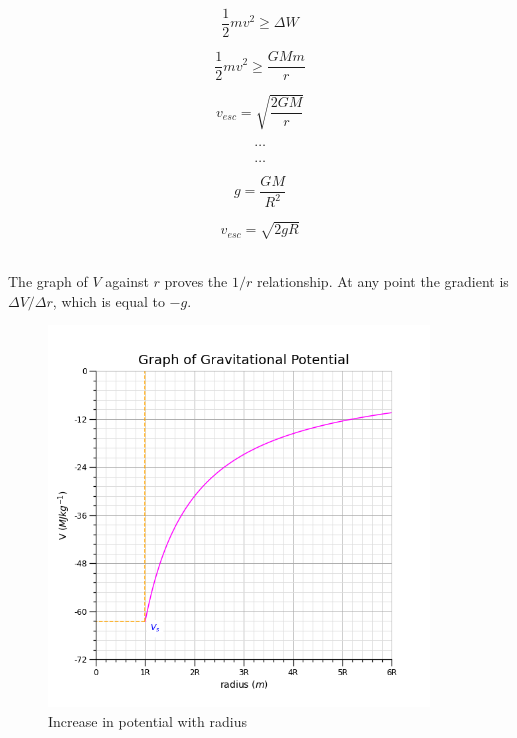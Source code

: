 \documentclass[10pt]{article}
\begin{document}
\begin{figure}[H]
\centering
\begin{minipage}{.8\textwidth}
\begin{tcolorbox}[
sharp corners=all,
colback=white,
colframe=white,
size=tight,
boxrule=0.2mm,
left=10mm, right=10mm
]
\begin{multicols}{2}
\noindent

\[\dfrac{1}{2} m v^2 \ge \Delta W\]

\[\dfrac{1}{2} m v^2 \ge \dfrac{GMm}{r}\]

\[ v_{esc} = \sqrt{\dfrac{2GM}{r}}\]

\[\textbf{\ldots}\]
\columnbreak


\[\textbf{\ldots}\]

\[g = \dfrac{GM}{R^2}\]

\[ v_{esc} = \sqrt{2gR}\]
\\

\end{multicols}
\end{tcolorbox}
\end{minipage}
\end{figure}

The graph of \(V\) against \(r\) proves the \(1/r\) relationship. At any point the gradient is \(\Delta V / \Delta r\), which is equal to \(-g\).

\begin{figure}[H]
\centering
\includegraphics[width=0.9\textwidth,keepaspectratio]{./images/gravitational_potential.png}
\caption{Increase in potential with radius}
\end{figure}
\end{document}
